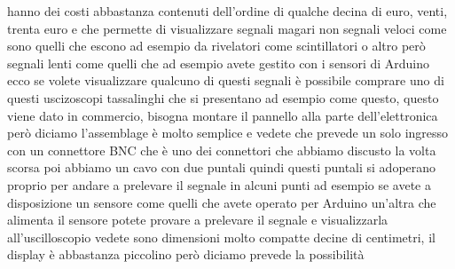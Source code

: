 {hanno dei costi abbastanza contenuti dell'ordine di qualche decina di euro, venti, trenta euro e che permette di visualizzare segnali magari non segnali veloci come sono quelli che escono ad esempio da rivelatori come scintillatori o altro però segnali lenti come quelli che ad esempio avete gestito con i sensori di Arduino ecco se volete visualizzare qualcuno di questi segnali è possibile comprare uno di questi uscizoscopi tassalinghi che si presentano ad esempio come questo, questo viene dato in commercio, bisogna montare il pannello alla parte dell'elettronica però diciamo l'assemblage è molto semplice e vedete che prevede un solo ingresso con un connettore BNC che è uno dei connettori che abbiamo discusto la volta scorsa poi abbiamo un cavo con due puntali quindi questi puntali si adoperano proprio per andare a prelevare il segnale in alcuni punti ad esempio se avete a disposizione un sensore come quelli che avete operato per Arduino un'altra che alimenta il sensore potete provare a prelevare il segnale e visualizzarla all'uscilloscopio vedete sono dimensioni molto compatte decine di centimetri, il display è abbastanza piccolino però diciamo prevede la possibilità 

}
